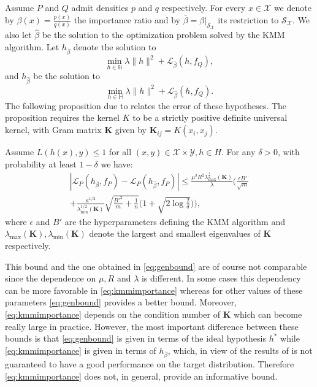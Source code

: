 \documentclass[twoside,11pt]{article}
\def\Hset{\mathbb{H}}
\newcommand{\e}{\epsilon}
\newcommand{\h}{\widehat}
\newcommand{\cL}{{\mathcal L}}
\newcommand{\cS}{{\mathcal S}}
\newcommand{\cX}{{\mathcal X}}
\newcommand{\cY}{{\mathcal Y}}
\newcommand{\mat}[1]{{\mathbf #1}}
\newcommand{\1}{\mat{1}}
\begin{document}
Assume $P$ and $Q$ admit densities $p$ and $q$ respectively. For every
$x \in \cX$ we denote by $\beta(x) = \frac{p(x)}{q(x)}$ the importance
ratio and by $\overline \beta = \beta \big|_{\cS_\cX}$ its restriction
to $\cS_\cX$. We also let $\h \beta$ be the solution to the
optimization problem  solved by the KMM algorithm.  Let
$h_{\overline \beta}$ denote the solution to
\begin{equation}
  \label{eq:importance}
\min_{h \in \Hset} \lambda \|h\|^2 + \cL_{\overline \beta}(h, f_Q),
\end{equation}
and $h_{\h \beta}$ be the solution to
\begin{equation}
  \label{eq:kmm}
\min_{h \in \Hset} \lambda \|h\|^2 + \cL_{\h \beta}(h, f_Q).
\end{equation}
The following proposition due to \cite{CortesMohriRileyRostamizadeh2008}
relates the error of these hypotheses. The proposition requires the
kernel $K$ to be a strictly positive definite universal kernel, with
Gram matrix $\mat K$  given by $\mat K_{ij} = K(x_i, x_j)$.

\begin{proposition}
  \label{prop:kmmimportance}
Assume $L(h(x), y) \leq 1$ for all
$(x, y) \in \cX \times \cY, h \in H$. For any $\delta > 0 $, with
probability at least $1 - \delta$ we have:
\begin{multline}
\label{eq:kmmimportance}
 |\cL_{P}(h_{\overline \beta}, f_P) - \cL_{P}(h_{\h \beta}, f_P)|
\leq \frac{\mu^2 R^2 \lambda_{\max}^{\frac{1}{2}}(\mat K) }{\lambda}\Big(
 \frac{\e B'}{\sqrt{m}} \\
+ \frac{\kappa^{1/2}}{\lambda^{1/2}_{\min}(\mat K)}
  \sqrt{\frac{B'^2}{m} + \frac{1}{n}} \Big(1 + \sqrt{2 \log
    \frac{2}{\delta}} \Big) \Big),
\end{multline}
where $\e$ and $B'$ are the hyperparameters defining the KMM
algorithm and $\lambda_{\max}(\mat K), \lambda_{\min}(\mat K)$ denote the
largest and smallest eigenvalues of $\mat K$ respectively.
\end{proposition}

This bound and the one obtained in \eqref{eq:genbound} are of course
not comparable since the dependence on $\mu, R$ and $\lambda$ is
different. In some cases this dependency can be more
favorable in \eqref{eq:kmmimportance} whereas for other values of
these parameters \eqref{eq:genbound} provides a better
bound. Moreover, \eqref{eq:kmmimportance} depends on the condition number
of $\mat K$ which can become really large in practice. However,
the most important difference between these bounds is that \eqref{eq:genbound}
is given in terms of the ideal hypothesis $h^*$
while \eqref{eq:kmmimportance} is given in terms of
$h_{\overline \beta}$, which, in view of the results of \cite{importance} is
not guaranteed to have a good performance on the target
distribution. Therefore \eqref{eq:kmmimportance} does not, in general,
provide an informative bound.
\end{document}
